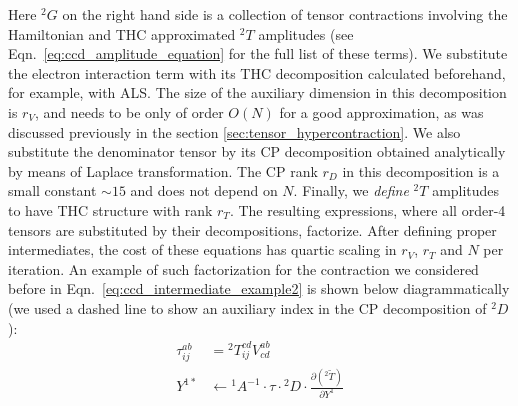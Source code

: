 Here ${}^2G$ on the right hand side is a collection of tensor contractions 
involving the Hamiltonian and THC approximated ${}^2T$ amplitudes 
(see Eqn.~\ref{eq:ccd_amplitude_equation} for the full list of these terms).
We substitute the electron interaction term with its THC decomposition 
calculated beforehand, for example, with ALS. The size of the auxiliary 
dimension in this decomposition is $r_{V}$, and needs to be only of order $O(N)$ 
for a good approximation, as was discussed previously in the section 
\ref{sec:tensor_hypercontraction}. We also substitute the denominator tensor by 
its CP decomposition obtained analytically by means of Laplace transformation. 
The CP rank $r_{D}$ in this decomposition is a small constant $\sim 15$ and 
does not depend on $N$. Finally, we \emph{define} ${}^2T$ amplitudes to have 
THC structure with rank $r_{T}$. The resulting expressions, where all order-4 
tensors are substituted by their decompositions, factorize. After defining 
proper intermediates, the cost of these equations has quartic scaling in 
$r_{V}$, $r_{T}$ and $N$ per iteration. An example of such factorization 
for the contraction we considered before 
in Eqn.~\ref{eq:ccd_intermediate_example2} is 
shown below diagrammatically (we used a dashed line to show an auxiliary 
index in the CP decomposition of ${}^2 D$):
\begin{equation}
\begin{split}
\tau^{ab}_{ij} & = {}^2 T^{cd}_{ij} V^{ab}_{cd} \\
Y^{1 \ast} &\longleftarrow {}^1A^{-1} \cdot \tau \cdot {}^{2}D 
\cdot \frac{\partial ({}^2\tilde{T})}{\partial Y^{1}}
\end{split}
\end{equation}
%
